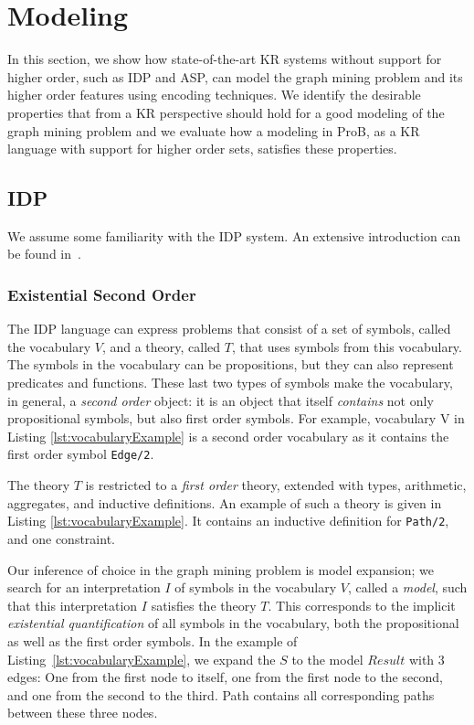 \section{Modeling}\label{sec:modeling}
In this section, we show how state-of-the-art KR systems without support for higher order, such as IDP and ASP, can model the graph mining problem and its higher order features using encoding techniques.
We identify the desirable properties that from a KR perspective should hold for a good modeling of the graph mining problem and we evaluate how a modeling in ProB, as a KR language with support for higher order sets, satisfies these properties.

\subsection{IDP}
We assume some familiarity with the IDP system.
An extensive introduction can be found in~\cite{}.
\subsubsection{Existential Second Order}
The IDP language can express problems that consist of a set of symbols, called the vocabulary $V$, and a theory, called $T$, that uses symbols from this vocabulary.
The symbols in the vocabulary can be propositions, but they can also represent predicates and functions.
These last two types of symbols make the vocabulary, in general, a \emph{second order} object: it is an object that itself \emph{contains} not only propositional symbols, but also first order symbols.
For example, vocabulary V in Listing \ref{lst:vocabularyExample} is a second order vocabulary as it contains the first order symbol \lstinline{Edge/2}.

The theory $T$ is restricted to a \emph{first order} theory, extended with types, arithmetic, aggregates, and inductive definitions.
An example of such a theory is given in Listing \ref{lst:vocabularyExample}.
It contains an inductive definition for \lstinline{Path/2}, and one constraint.

Our inference of choice in the graph mining problem is model expansion; we search for an interpretation $I$ of symbols in the vocabulary $V$, called a \emph{model}, such that this interpretation $I$ satisfies the theory $T$.
This corresponds to the implicit \emph{existential quantification} of all symbols in the vocabulary, both the propositional as well as the first order symbols.
In the example of Listing~\ref{lst:vocabularyExample}, we expand the $S$ to the model $Result$ with 3 edges: One from the first node to itself, one from the first node to the second, and one from the second to the third.
Path contains all corresponding paths between these three nodes.

